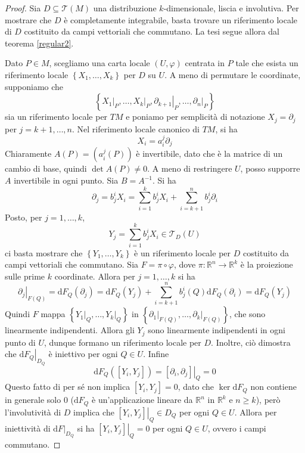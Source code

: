 \documentclass[a4paper,11pt]{article}
\theoremstyle{definition}
\theoremstyle{theorem}
\newcommand{\dif}{\mathrm{d}}
\newcommand{\R}{\mathbb{R}}
\begin{document}
\begin{proof}
		Sia $D\subseteq\mathcal{T}(M)$ una distribuzione $k$-dimensionale, liscia e involutiva. Per mostrare che $D$ è completamente integrabile, basta trovare un riferimento locale di $D$ costituito da campi vettoriali che commutano. La tesi segue allora dal teorema \ref{regular2}.
		
		Dato $P\in M$, scegliamo una carta locale $(U,\varphi)$ centrata in $P$ tale che esista un riferimento locale $\left\{X_1,\dots,X_k\right\}$ per $D$ su $U$. A meno di permutare le coordinate, supponiamo che
		\[\left\{\left.X_1\right|_P,\dots,\left.X_k\right|_P,\left.\partial_{k+1}\right|_P,\dots,\left.\partial_n\right|_P\right\}\]
		sia un riferimento locale per $TM$ e poniamo per semplicità di notazione $X_j=\partial _j$ per $j=k+1,\dots,n$.
		Nel riferimento locale canonico di $TM$, si ha
		\[X_i=a_i^j\partial_j\]
		Chiaramente $A(P)=\left(a_i^j(P)\right)$ è invertibile, dato che è la matrice di un cambio di base, quindi $\det A(P)\neq0$. A meno di restringere $U$, posso supporre $A$ invertibile in ogni punto. Sia $B=A^{-1}$. Si ha
		\[\partial_j=b_j^iX_i=\sum_{i=1}^{k}b_j^iX_i+\sum_{i=k+1}^{n}b_j^i\partial_i\]
		Posto, per $j=1,\dots,k$,
		\[Y_j=\sum_{i=1}^{k}b_j^iX_i\in\mathcal{T}_D(U)\]
		ci basta mostrare che $\left\{Y_1,\dots,Y_k\right\}$ è un riferimento locale per $D$ costituito da campi vettoriali che commutano. Sia $F=\pi\circ\varphi$, dove $\pi\colon\R^n\to\R^k$ è la proiezione sulle prime $k$ coordinate. Allora per $j=1,\dots,k$ si ha
		\[\left.\partial_j\right|_{F(Q)}=\dif F_Q(\partial_j)=\dif F_Q(Y_j)+\sum_{i=k+1}^{n}b^i_j(Q)\dif F_Q(\partial_i)=\dif F_Q(Y_j)\]
		Quindi $F$ mappa $\left\{\left.Y_1\right|_Q,\dots,\left.Y_k\right|_Q\right\}$ in $\left\{\left.\partial_1\right|_{F(Q)},\dots,\left.\partial_k\right|_{F(Q)}\right\}$, che sono linearmente indipendenti. Allora gli $Y_j$ sono linearmente indipendenti in ogni punto di $U$, dunque formano un riferimento locale per $D$. Inoltre, ciò dimostra che $\left.\dif F_Q\right|_{D_Q}$ è iniettivo per ogni $Q\in U$. Infine
		\[\dif F_Q([Y_i,Y_j])=\left.[\partial_i,\partial_j]\right|_Q=0\]
		Questo fatto di per sé non implica $[Y_i,Y_j]=0$, dato che $\ker\dif F_Q$ non contiene in generale solo 0 ($\dif F_Q$ è un'applicazione lineare da $\R^n$ in $\R^k$ e $n\geq k$), però l'involutività di $D$ implica che $\left.[Y_i,Y_j]\right|_Q\in D_Q$ per ogni $Q\in U$. Allora per iniettività di $\left.\dif F\right|_{D_Q}$ si ha $\left.[Y_i,Y_j]\right|_Q=0$ per ogni $Q\in U$, ovvero i campi commutano.
\end{proof}
\end{document}
